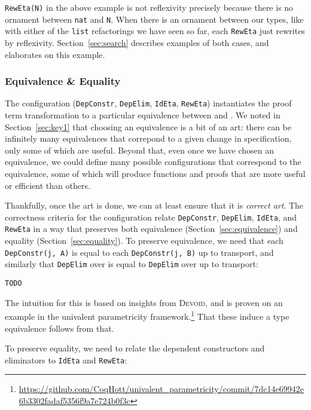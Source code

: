 \lstinline{RewEta(N)} in the above example is not reflexivity precisely because there is no ornament
between \lstinline{nat} and \lstinline{N}.
When there is an ornament between our types, like with either of the \lstinline{list} refactorings we have seen so far,
each \lstinline{RewEta} just rewrites by reflexivity.
Section~\ref{sec:search} describes examples of both cases, and elaborates on this example.

\subsubsection{Equivalence \& Equality}
\label{sec:art}

The configuration (\lstinline{DepConstr}, \lstinline{DepElim}, \lstinline{IdEta}, \lstinline{RewEta}) instantiates
the proof term transformation to a particular equivalence between \A and \B.
We noted in Section~\ref{sec:key1} that choosing an equivalence is a bit of an art:
there can be infinitely many equivalences that correpond to a 
given change in specification, only some of which are useful.
Beyond that, even once we have chosen an equivalence, we could define many possible configurations that correspond
to the equivalence, some of which will produce functions and proofs that are more useful or efficient than others.

Thankfully, once the art is done, we can at least ensure that it is \textit{correct art}.
The correctness criteria for the configuration relate \lstinline{DepConstr}, \lstinline{DepElim}, \lstinline{IdEta}, and \lstinline{RewEta}
in a way that preserves both equivalence (Section~\ref{sec:equivalence}) and equality (Section~\ref{sec:equality}).
To preserve equivalence, we need that each \lstinline{DepConstr(j, A)} is equal to each \lstinline{DepConstr(j, B)} up to transport,
and similarly that \lstinline{DepElim} over \A is equal to \lstinline{DepElim} over \B up to transport:

\begin{lstlisting}
TODO
\end{lstlisting}
The intuition for this is based on insights from \textsc{Devoid},
and is proven on an example in the univalent parametricity framework.\footnote{\url{https://github.com/CoqHott/univalent_parametricity/commit/7dc14e69942e6b3302fadaf5356f9a7e724b0f3c}}
That these induce a type equivalence follows from that.

To preserve equality, we need to relate the dependent constructors and eliminators to
\lstinline{IdEta} and \lstinline{RewEta}:


